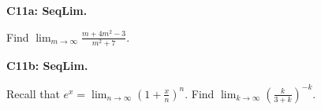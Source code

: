 \documentclass[12pt]{article}
\newcommand{\<}{\left\langle}
\renewcommand{\>}{\right\rangle}
\newcommand{\exerciseHeader}[4]{


  \vspace{0.5em}
  \textbf{#2}
  \vspace{0.5em}

}
\begin{document}
\begin{multicols}{2}
%

%

%

\exerciseHeader{2017 July 13}{C11a: SeqLim.}{
Compute the limit of a convergent sequence.
}{4/4}

Find \(\displaystyle\lim_{m\to\infty}\frac{m+4m^2-3}{m^2+7}\).

\exerciseHeader{2017 July 13}{C11b: SeqLim.}{
Compute the limit of a convergent sequence.
}{4/4}

Recall that \(e^x=\lim_{n\to\infty}(1+\frac{x}{n})^n\).
Find \(\displaystyle\lim_{k\to\infty}\left(\frac{k}{3+k}\right)^{-k}\).


%

%

%

%


\end{multicols}
\end{document}
